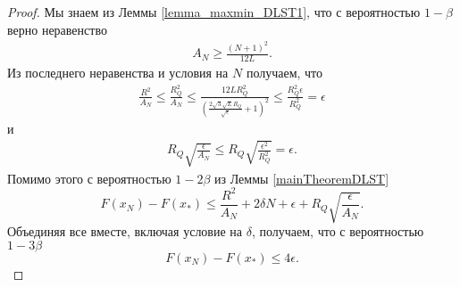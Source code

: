 \documentclass[11pt,a4]{article}
\newtheorem{remark}{Замечание}
\begin{document}
\begin{proof}
Мы знаем из Леммы \ref{lemma_maxmin_DLST1}, что с вероятностью $1 - \beta$ верно неравенство \begin{gather*}
A_N \geq \frac{(N+1)^2}{12L}.\end{gather*} 
Из последнего неравенства и условия на $N$ получаем, что
\begin{gather*}
\frac{R^2}{A_{N}} \leq \frac{R_Q^2}{A_{N}} \leq \frac{12LR_Q^2}{\left(\frac{2\sqrt{3}\sqrt{L}R_Q}{\sqrt{\epsilon}}+1\right)^2}\leq
\frac{R_Q^2\epsilon}{R_Q^2}=\epsilon
\end{gather*}
и
\begin{gather*}
R_Q\sqrt{\frac{\epsilon}{A_N}} \leq R_Q\sqrt{\frac{\epsilon^2}{R_Q^2}} =\epsilon.
\end{gather*}
Помимо этого с вероятностью $1 - 2\beta$ из Леммы \ref{mainTheoremDLST}
\begin{equation*}
F(x_N) - F(x_*)\leq \frac{R^2}{A_{N}} + 2\delta N + \epsilon + R_Q\sqrt{\frac{\epsilon}{A_N}}.
\end{equation*}
Объединяя все вместе, включая условие на $\delta$, получаем, что с вероятностью $1 - 3\beta$
\begin{equation*}
F(x_N) - F(x_*) \leq 4\epsilon.
\end{equation*}
\end{proof}

\iffalse
\begin{remark}
\leavevmode
Оценим количество обращений $M$ к оракулу за стохастическими градиентами. Как и в Замечании \ref{remark_maxmin} количество обращений за $\widetilde{\nabla}^{m_{k+1}} f_\delta(y_{k+1})$ будет меньше или равно $2N + 2\log_2(\frac{2L_N}{L_0})$, учитывая выбор $\widetilde{\Omega}$, $L_N \leq 3L$ с вероятностью $1 - \beta$. Далее для простоты учитывать слагаемое $2\log_2(\frac{6L}{L_0})$ не будем. Получаем, что общее количество обращений к оракулу за $\nabla f_\delta(y;\xi)$ равно
\begin{gather*}
M = 2\sum_{k=0}^{N-1}m_{k+1}\leq 2N + \frac{6\sigma^2\widetilde{\Omega}}{\epsilon}A_N
\end{gather*}
\iffalse
Если $A_N \leq \frac{2R^2}{\epsilon}$, то
\begin{gather*}
M = \frac{6\sigma^2\widetilde{\Omega}}{\epsilon}A_N \leq \frac{12\sigma^2\widetilde{\Omega}R^2}{\epsilon^2}
\end{gather*}
\fi
\end{remark}
\fi
\end{document}
